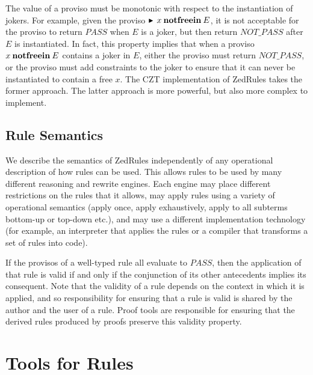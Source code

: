 \documentclass{entcs}
\begin{document}
The value of a proviso must be monotonic with respect to the
instantiation of jokers.  For example, given the proviso $\proviso x
\notfreein E$, it is not acceptable for the proviso to return $PASS$
when $E$ is a joker, but then return $NOT\_PASS$ after $E$ is
instantiated.  In fact, this property implies that when a proviso $x
\mathbin{\mathop{\mathstrut{\mbox{\textbf{notfreein}}}}\nolimits} E$ contains a joker in $E$, either the proviso must return
$NOT\_PASS$, or the proviso must add constraints to the joker to
ensure that it can never be instantiated to contain a free $x$.  The
CZT implementation of ZedRules takes the former approach.  The latter
approach is more powerful, but also more complex to implement.


\subsection{Rule Semantics}

We describe the semantics of ZedRules independently of any operational
description of how rules can be used.  This allows rules to be used by
many different reasoning and rewrite engines.  Each engine may place
different restrictions on the rules that it allows, may apply rules
using a variety of operational semantics (apply once, apply
exhaustively, apply to all subterms bottom-up or top-down etc.), and
may use a different implementation technology (for example, an
interpreter that applies the rules or a compiler that transforms a set
of rules into code).

If the provisos of a well-typed rule all evaluate to $PASS$, then the
application of that rule is valid if and only if the conjunction of
its other antecedents implies its consequent.  Note that the validity
of a rule depends on the context in which it is applied, and so
responsibility for ensuring that a rule is valid is shared by the
author and the user of a rule.  Proof tools are responsible for
ensuring that the derived rules produced by proofs preserve this
validity property.


\section{Tools for Rules} \label{sec:tools}
\end{document}
